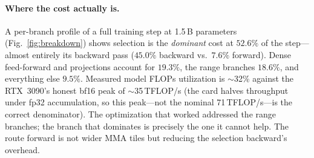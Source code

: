 \documentclass[11pt]{article}
\begin{document}
\paragraph{Where the cost actually is.} A per-branch profile of a full training step at 1.5\,B
parameters (Fig.~\ref{fig:breakdown}) shows selection is the \emph{dominant} cost at $52.6\%$ of the
step---almost entirely its backward pass ($45.0\%$ backward vs.\ $7.6\%$ forward). Dense
feed-forward and projections account for $19.3\%$, the range branches $18.6\%$, and everything else
$9.5\%$. Measured model FLOPs utilization is $\sim$32\% against the RTX~3090's honest bf16 peak of
$\sim$35\,TFLOP/s (the card halves throughput under fp32 accumulation, so this peak---not the
nominal 71\,TFLOP/s---is the correct denominator). The optimization that worked addressed the range
branches; the branch that dominates is precisely the one it cannot help. The route forward is not
wider MMA tiles but reducing the selection backward's overhead.
\end{document}
